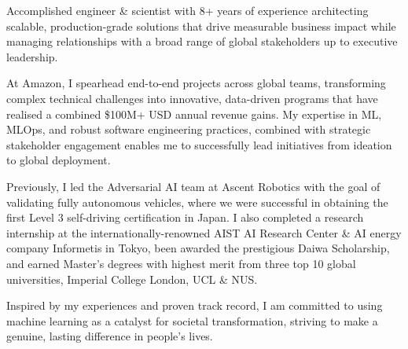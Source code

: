 

\begin{cvparagraph}

Accomplished engineer \& scientist with 8+ years of experience architecting scalable, production-grade solutions that drive measurable business impact while managing relationships with a broad range of global stakeholders up to executive leadership.

At Amazon, I spearhead end-to-end projects across global teams, transforming complex technical challenges into innovative, data-driven programs that have realised a combined \$100M+ USD annual revenue gains. My expertise in ML, MLOps, and robust software engineering practices, combined with strategic stakeholder engagement enables me to successfully lead initiatives from ideation to global deployment.

Previously, I led the Adversarial AI team at Ascent Robotics with the goal of validating fully autonomous vehicles, where we were successful in obtaining the first Level 3 self-driving certification in Japan. I also completed a research internship at the internationally-renowned AIST AI Research Center \& AI energy company Informetis in Tokyo, been awarded the prestigious Daiwa Scholarship, and earned Master's degrees with highest merit from three top 10 global universities, Imperial College London, UCL \& NUS. 

Inspired by my experiences and proven track record, I am committed to using machine learning as a catalyst for societal transformation, striving to make a genuine, lasting difference in people's lives.



\end{cvparagraph}